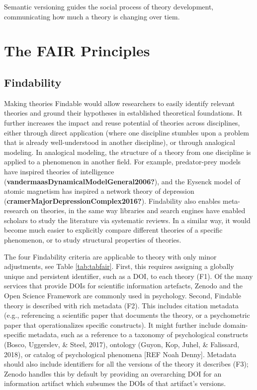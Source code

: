 \documentclass[
  man,floatsintext]{apa6}
\begin{document}
Semantic versioning guides the social process of theory development, communicating how much a theory is changing over tiem.

\section{The FAIR Principles}\label{the-fair-principles}

\subsection{Findability}\label{findability}

Making theories Findable would allow researchers to easily identify relevant theories
and ground their hypotheses in established theoretical foundations.
It further increases the impact and reuse potential of theories across disciplines,
either through direct application (where one discipline stumbles upon a problem that is already well-understood in another discipline),
or through analogical modeling.
In analogical modeling, the structure of a theory from one discipline is applied to a phenomenon in another field.
For example, predator-prey models have inspired theories of intelligence (\textbf{vandermaasDynamicalModelGeneral2006?}), and the Eysenck model of atomic magnetism has inspired a network theory of depression (\textbf{cramerMajorDepressionComplex2016?}).
Findability also enables meta-research on theories,
in the same way libraries and search engines have enabled scholars to study the literature via systematic reviews.
In a similar way, it would become much easier to explicitly compare different theories of a specific phenomenon,
or to study structural properties of theories.

The four Findability criteria are applicable to theory with only minor adjustments, see Table \ref{tab:tabfair}.
First, this requires assigning a globally unique and persistent identifier, such as a DOI, to each theory (F1).
Of the many services that provide DOIs for scientific information artefacts,
Zenodo and the Open Science Framework are commonly used in psychology.
Second, Findable theory is described with rich metadata (F2).
This includes citation metadata (e.g., referencing a scientific paper that documents the theory, or a psychometric paper that operationalizes specific constructs).
It might further include domain-specific metadata, such as a reference to a taxonomy of psychological constructs (Bosco, Uggerslev, \& Steel, 2017),
ontology (Guyon, Kop, Juhel, \& Falissard, 2018),
or catalog of psychological phenomena {[}REF Noah Denny{]}.
Metadata should also include identifiers for all the versions of the theory it describes (F3);
Zenodo handles this by default by providing an overarching DOI for an information artifact which subsumes the DOIs of that artifact's versions.
\end{document}
